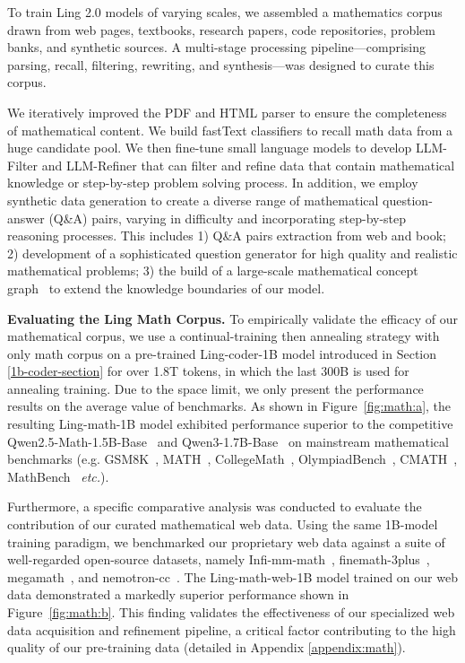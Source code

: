 To train Ling 2.0 models of varying scales, we assembled a mathematics corpus drawn from web pages, textbooks, research papers, code repositories, problem banks, and synthetic sources. A multi-stage processing pipeline—comprising parsing, recall, filtering, rewriting, and synthesis—was designed to curate this corpus.

We iteratively improved the PDF and HTML parser to ensure the completeness of mathematical content. We build fastText classifiers to recall math data from a huge candidate pool. We then fine-tune small language models to develop LLM-Filter and LLM-Refiner that can filter and refine data that contain mathematical knowledge or step-by-step problem solving process.
In addition, we employ synthetic data generation to create a diverse range of mathematical question-answer (Q\&A) pairs, varying in difficulty and incorporating step-by-step reasoning processes. This includes 1) Q\&A pairs extraction from web and book; 2) development of a sophisticated question generator for high quality and realistic mathematical problems; 3) the build of a large-scale mathematical concept graph~\citep{chen2025arrows} to extend the knowledge boundaries of our model.

{\bfseries Evaluating the Ling Math Corpus. }
To empirically validate the efficacy of our mathematical corpus, we use a continual-training then annealing strategy with only math corpus on a pre-trained Ling-coder-1B model introduced in Section \ref{1b-coder-section} for over 1.8T tokens, in which the last 300B is used for annealing training. Due to the space limit, we only present the performance results on the average value of benchmarks. As shown in Figure~\ref{fig:math:a}, the resulting Ling-math-1B model exhibited performance superior to the competitive Qwen2.5-Math-1.5B-Base~\citep{yang2024qwen25mathtechnicalreportmathematical} and Qwen3-1.7B-Base~\citep{qwen3} on mainstream mathematical benchmarks (e.g. GSM8K~\citep{gsm8k}, MATH~\citep{math}, CollegeMath~\citep{college-math}, OlympiadBench~\citep{olympiadbench}, CMATH~\citep{cmath}, MathBench~\citep{mathbench} \emph{etc.}). 

Furthermore, a specific comparative analysis was conducted to evaluate the contribution of our curated mathematical web data. Using the same 1B-model training paradigm, we benchmarked our proprietary web data against a suite of well-regarded open-source datasets, namely Infi-mm-math~\citep{han2024infimmwebmath40badvancingmultimodalpretraining}, finemath-3plus~\citep{allal2025smollm2smolgoesbig}, megamath~\citep{zhou2025megamath}, and nemotron-cc~\citep{mahabadi2025nemotron}. The Ling-math-web-1B model trained on our web data demonstrated a markedly superior performance shown in Figure~\ref{fig:math:b}. This finding validates the effectiveness of our specialized web data acquisition and refinement pipeline, a critical factor contributing to the high quality of our pre-training data (detailed in Appendix \ref{appendix:math}).


